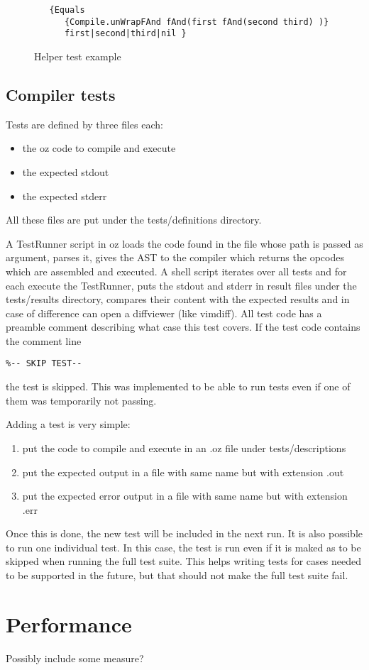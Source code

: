 \documentclass[a4paper]{memoir}
\begin{document}
\begin{figure}
\begin{lstlisting}
   {Equals 
      {Compile.unWrapFAnd fAnd(first fAnd(second third) )}
      first|second|third|nil }
\end{lstlisting}
\label{fig:helperstestsexample}
\caption{Helper test example}
\end{figure}
\subsection{Compiler tests}
Tests are defined by three files each:
\begin{itemize}
  \item the oz code to compile and execute
  \item the expected stdout
  \item the expected stderr
\end{itemize}
All these files are put under the tests/definitions directory.

A TestRunner script in oz loads the code found in the file whose path is passed as argument, parses it, gives the AST to the compiler which returns the opcodes which are assembled and executed. 
A shell script iterates over all tests and for each execute the TestRunner, puts the stdout and stderr in result files under the tests/results directory, compares their content with the expected results and in case of difference can open a diffviewer (like vimdiff).
All test code has a preamble comment describing what case this test covers.
If the test code contains the comment line
\begin{lstlisting}
%-- SKIP TEST-- 
\end{lstlisting}
the test is skipped. This was implemented to be able to run tests even if one of them was temporarily not passing.

Adding a test is very simple:
\begin{enumerate}
  \item put the code to compile and execute in an .oz file under tests/descriptions
  \item put the expected output in a file with same name but with extension .out
  \item put the expected error output in a file with same name but with extension .err
\end{enumerate}
Once this is done, the new test will be included in the next run.
It is also possible to run one individual test. In this case, the test is run even if it is maked as to be skipped when running the full test suite. This helps writing tests for cases needed to be supported in the future, but that should not make the full test suite fail.
\section{Performance}
Possibly include some measure?
\end{document}
